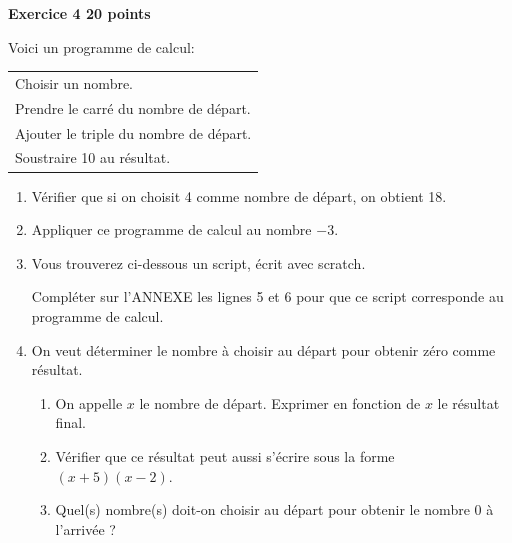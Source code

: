 \documentclass[11pt]{article}
\begin{document}
\textbf{Exercice 4 \hfill 20 points}

\medskip

\parbox{0.45\linewidth}{Voici un programme de calcul:}
\hfill
\parbox{0.45\linewidth}{\begin{tabular}{|l|}\hline
Choisir un nombre.\\
Prendre le carré du nombre de départ.\\
Ajouter le triple du nombre de départ.\\
Soustraire 10 au résultat.\\ \hline
\end{tabular}}

\medskip

\begin{enumerate}
\item Vérifier que si on choisit 4 comme nombre de départ, on obtient 18. 
\item Appliquer ce programme de calcul au nombre $- 3$.
\item Vous trouverez ci-dessous un script, écrit avec scratch.


\begin{scratch}
\end{scratch}

\medskip

Compléter sur l'ANNEXE  les lignes 5 et 6 pour que ce script corresponde au programme de calcul.

\item On veut déterminer le nombre à choisir au départ pour obtenir zéro comme résultat. 
	\begin{enumerate}
		\item On appelle $x$ le nombre de départ. Exprimer en fonction de $x$ le résultat final.
		\item Vérifier que ce résultat peut aussi s'écrire sous la forme $(x + 5)(x - 2)$.
		\item Quel(s) nombre(s) doit-on choisir au départ pour obtenir le nombre $0$ à l'arrivée ?
	\end{enumerate}
\end{enumerate}
\end{document}
